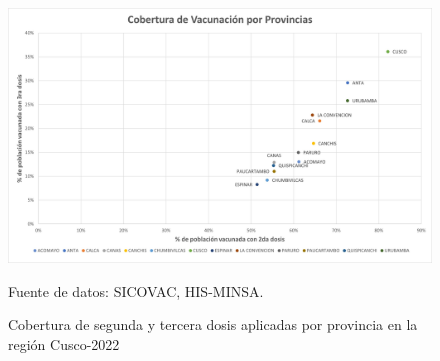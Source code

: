 \documentclass[12pt,a4paper,openany]{book}
\begin{document}
\begin{landscape}
	\begin{figure}[ht]
		\caption{Cobertura de segunda y tercera dosis aplicadas por provincia en la región Cusco-2022}\label{fig:Cobertura_Vacunacion_Provincias}
		\begin{center}
			\includegraphics[width=0.90\linewidth]{../sala_covid/../sala_nacional/Cobertura_Vacunacion_Provincias.jpg}
		\end{center}
		{\footnotesize {Fuente de datos: SICOVAC, HIS-MINSA.}}
	\end{figure}
\end{landscape}
\end{document}
